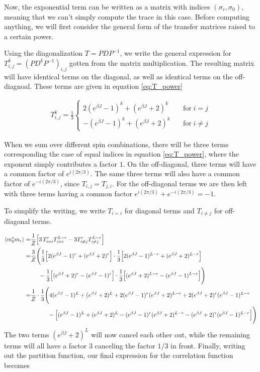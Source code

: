 \documentclass[reprint,english,notitlepage,aps,nobalancelastpage,nofootinbib]{revtex4-1}
\newcommand{\ebj}{e^{\beta J}}
\begin{document}
Now, the exponential term can be written as a matrix with indices $(\sigma_r,\sigma_0)$, meaning that we can't simply compute the trace in this case. Before computing anything, we will first consider the general form of the transfer matrices raised to a certain power. 

Using the diagonalization $T=PDP^{-1}$, we write the general expression for $T_{i,j}^k=(PD^k P^{-1})_{i,j}$ gotten from the matrix multiplication. The resulting matrix will have identical terms on the diagonal, as well as identical terms on the off-diagnoal. These terms are given in equation \eqref{eq:T_power}  

\begin{align} \label{eq:T_power}
	T_{i,j}^k = \frac{1}{3}\begin{cases}
		2(\ebj-1)^k + (\ebj+2)^k \quad &\mathrm{for}\; i=j \\ 
		-(\ebj-1)^k + (\ebj+2)^k \quad &\mathrm{for}\; i\neq j
	\end{cases}
\end{align}

When we sum over different spin combinations, there will be three terms corresponding the case of equal indices in equation \eqref{eq:T_power}, where the exponent simply contributes a factor $1$. On the off-diagonal, three terms will have a common factor of $e^{i(2\pi/3)}$. The same three terms will also have a common factor of $e^{-i(2\pi/3)}$, since $T_{i,j}=T_{j,i}$. For the off-diagonal terms we are then left with three terms having a common factor $e^{i(2\pi/3)} + e^{-i(2\pi/3)}=-1$. 

To simplify the writing, we write $T_{i=i}$ for diagonal terms and $T_{i\neq j}$ for off-diagonal terms.

\begin{align*}
	\expval{m_0^* m_r} =& \frac{1}{Z} \Big[ 3\, T_{i=i}^r T_{i=i}^{L-r} - 3T_{i\neq j}^r T_{i\neq j}^{L-r} \Big] \\ 
	=& \frac{3}{Z} \Bigg( \frac{1}{3} \Big[ 2(\ebj-1)^r + (\ebj+2)^r \Big]\cdot \frac{1}{3} \Big[2(\ebj-1)^{L-r} + (\ebj+2)^{L-r} \Big] \\ 
	&\quad\:\: -\frac{1}{3}\Big[(\ebj+2)^r-(\ebj-1)^r \Big] \cdot \frac{1}{3}\Big[(\ebj+2)^{L-r}-(\ebj-1)^{L-r} \Big]  \Bigg) \\
	=& \frac{1}{Z} \cdot \frac{1}{3} \Bigg( 4(\ebj-1)^L + (\ebj+2)^L + 2(\ebj-1)^r (\ebj+2)^{L-r} + 2 (\ebj+2)^r (\ebj-1)^{L-r}  \\
	& \qquad\quad - \Big[(\ebj-1)^L + (\ebj+2)^L - (\ebj-1)^r (\ebj+2)^{L-r} - (\ebj+2)^r (\ebj-1)^{L-r} \Big] \Bigg)
\end{align*}
The two terms $(\ebj+2)^L$ will now cancel each other out, while the remaining terms will all have a factor $3$ canceling the factor $1/3$ in front. Finally, writing out the partition function, our final expression for the correlation function becomes 
\end{document}
